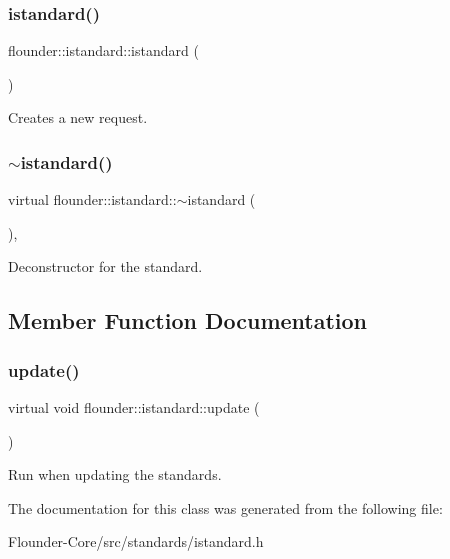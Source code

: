 \subsubsection{\texorpdfstring{istandard()}{istandard()}}
{\footnotesize\ttfamily flounder\+::istandard\+::istandard (\begin{DoxyParamCaption}{ }\end{DoxyParamCaption})\hspace{0.3cm}{\ttfamily [inline]}}



Creates a new request. 

\mbox{\label{classflounder_1_1istandard_a971c1469c6a0156351b31aa95ef61b34}} 
\subsubsection{\texorpdfstring{$\sim$istandard()}{~istandard()}}
{\footnotesize\ttfamily virtual flounder\+::istandard\+::$\sim$istandard (\begin{DoxyParamCaption}{ }\end{DoxyParamCaption})\hspace{0.3cm}{\ttfamily [inline]}, {\ttfamily [virtual]}}



Deconstructor for the standard. 



\subsection{Member Function Documentation}
\mbox{\label{classflounder_1_1istandard_a3297f71b53e925c6ab6536c2697f93fc}} 
\subsubsection{\texorpdfstring{update()}{update()}}
{\footnotesize\ttfamily virtual void flounder\+::istandard\+::update (\begin{DoxyParamCaption}{ }\end{DoxyParamCaption})\hspace{0.3cm}{\ttfamily [pure virtual]}}



Run when updating the standards. 



The documentation for this class was generated from the following file\+:\begin{DoxyCompactItemize}
\item 
Flounder-\/\+Core/src/standards/istandard.\+h\end{DoxyCompactItemize}
